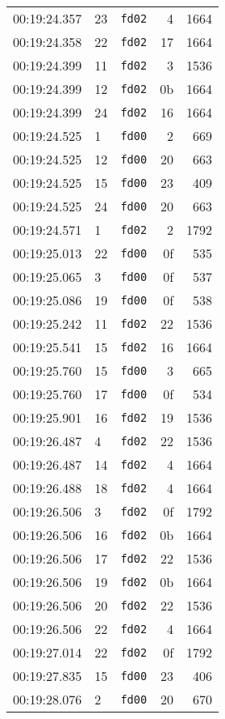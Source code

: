 \documentclass{article}
\begin{document}
\begin{longtable}{lllrr}
00:19:24.357 & 23 & \texttt{fd02} & 4 & 1664 \\
00:19:24.358 & 22 & \texttt{fd02} & 17 & 1664 \\
00:19:24.399 & 11 & \texttt{fd02} & 3 & 1536 \\
00:19:24.399 & 12 & \texttt{fd02} & 0b & 1664 \\
00:19:24.399 & 24 & \texttt{fd02} & 16 & 1664 \\
00:19:24.525 & 1 & \texttt{fd00} & 2 & 669 \\
00:19:24.525 & 12 & \texttt{fd00} & 20 & 663 \\
00:19:24.525 & 15 & \texttt{fd00} & 23 & 409 \\
00:19:24.525 & 24 & \texttt{fd00} & 20 & 663 \\
00:19:24.571 & 1 & \texttt{fd02} & 2 & 1792 \\
00:19:25.013 & 22 & \texttt{fd00} & 0f & 535 \\
00:19:25.065 & 3 & \texttt{fd00} & 0f & 537 \\
00:19:25.086 & 19 & \texttt{fd00} & 0f & 538 \\
00:19:25.242 & 11 & \texttt{fd02} & 22 & 1536 \\
00:19:25.541 & 15 & \texttt{fd02} & 16 & 1664 \\
00:19:25.760 & 15 & \texttt{fd00} & 3 & 665 \\
00:19:25.760 & 17 & \texttt{fd00} & 0f & 534 \\
00:19:25.901 & 16 & \texttt{fd02} & 19 & 1536 \\
00:19:26.487 & 4 & \texttt{fd02} & 22 & 1536 \\
00:19:26.487 & 14 & \texttt{fd02} & 4 & 1664 \\
00:19:26.488 & 18 & \texttt{fd02} & 4 & 1664 \\
00:19:26.506 & 3 & \texttt{fd02} & 0f & 1792 \\
00:19:26.506 & 16 & \texttt{fd02} & 0b & 1664 \\
00:19:26.506 & 17 & \texttt{fd02} & 22 & 1536 \\
00:19:26.506 & 19 & \texttt{fd02} & 0b & 1664 \\
00:19:26.506 & 20 & \texttt{fd02} & 22 & 1536 \\
00:19:26.506 & 22 & \texttt{fd02} & 4 & 1664 \\
00:19:27.014 & 22 & \texttt{fd02} & 0f & 1792 \\
00:19:27.835 & 15 & \texttt{fd00} & 23 & 406 \\
00:19:28.076 & 2 & \texttt{fd00} & 20 & 670 \\

\end{longtable}
\end{document}
